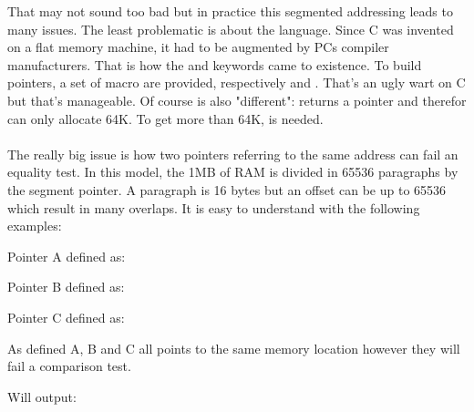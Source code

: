 \documentclass[book.tex]{subfiles}
\begin{document}
That may not sound too bad but in practice this segmented addressing leads to many issues.
The least problematic is about the language. Since C was invented on a flat memory machine, it had to be augmented by PCs compiler manufacturers. That is how the  and  keywords came to existence. To build pointers, a set of macro are provided, respectively  and . That's an ugly wart on C but that's manageable. Of course  is also "different":  returns a  pointer and therefor can only allocate 64K. To get more than 64K,  is needed.\\
\\
The really big issue is how two pointers referring to the same address can fail an equality test. In this model, the 1MB of RAM is divided in 65536 paragraphs by the segment pointer. A paragraph is 16 bytes but an offset can be up to 65536 which result in many overlaps. It is easy to understand with the following examples:\\
\par
Pointer A defined as:\\
\par
\begin{minipage}{\textwidth}

\end{minipage}

\bigskip

Pointer B defined as:\\
\par
\begin{minipage}{\textwidth}

\end{minipage}

\bigskip

Pointer C defined as:\\
\par
\begin{minipage}{\textwidth}

\end{minipage}

As defined A, B and C all points to the same memory location however they will fail a comparison test.\\

\begin{minipage}{\textwidth}

\end{minipage}
\par
Will output:\\
\end{document}
